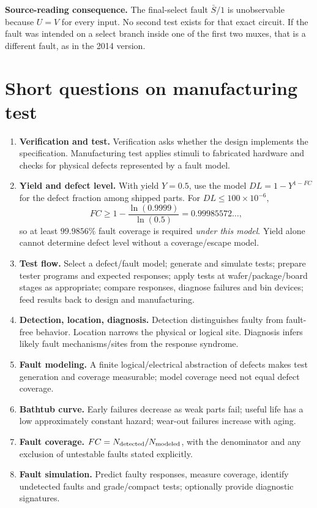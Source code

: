 \documentclass[11pt]{article}
\begin{document}
\textbf{Source-reading consequence.} The final-select fault $\bar S/1$
is unobservable because $U=V$ for every input. No second test exists for
that exact circuit. If the fault was intended on a select branch inside
one of the first two muxes, that is a different fault, as in the 2014 version.
\section{Short questions on manufacturing test}
\begin{enumerate}[label=(\alph*)]
\item \textbf{Verification and test.} Verification asks whether the design implements
the specification. Manufacturing test applies stimuli to fabricated hardware and
checks for physical defects represented by a fault model.
\item \textbf{Yield and defect level.} With yield $Y=0.5$, use the model
$DL=1-Y^{1-FC}$ for the defect fraction among shipped parts.
For $DL\le100\times10^{-6}$,
\[
 FC\ge1-\frac{\ln(0.9999)}{\ln(0.5)}
 =0.99985572\ldots,
\]
so at least $99.9856\%$ fault coverage is required \emph{under this model}.
Yield alone cannot determine defect level without a coverage/escape model.
\item \textbf{Test flow.} Select a defect/fault model; generate and simulate tests;
prepare tester programs and expected responses; apply tests at wafer/package/board
stages as appropriate; compare responses, diagnose failures and bin devices;
feed results back to design and manufacturing.
\item \textbf{Detection, location, diagnosis.} Detection distinguishes faulty from
fault-free behavior. Location narrows the physical or logical site. Diagnosis
infers likely fault mechanisms/sites from the response syndrome.
\item \textbf{Fault modeling.} A finite logical/electrical abstraction of defects makes
test generation and coverage measurable; model coverage need not equal defect coverage.
\item \textbf{Bathtub curve.} Early failures decrease as weak parts fail;
useful life has a low approximately constant hazard;
wear-out failures increase with aging.
\item \textbf{Fault coverage.} $FC=N_{\rm detected}/N_{\rm modeled}$, with the
denominator and any exclusion of untestable faults stated explicitly.
\item \textbf{Fault simulation.} Predict faulty responses, measure coverage, identify
undetected faults and grade/compact tests; optionally provide diagnostic signatures.
\end{enumerate}
\begin{center}\end{center}
\end{document}
